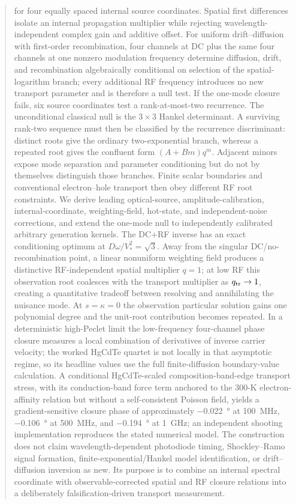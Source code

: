 \documentclass[11pt]{article}
\begin{document}
\begin{abstract}
for four equally spaced internal source coordinates. Spatial first differences isolate an internal propagation multiplier while rejecting wavelength-independent complex gain and additive offset. For uniform drift--diffusion with first-order recombination, four channels at DC plus the same four channels at one nonzero modulation frequency determine diffusion, drift, and recombination algebraically conditional on selection of the spatial-logarithm branch; every additional RF frequency introduces no new transport parameter and is therefore a null test. If the one-mode closure fails, six source coordinates test a rank-at-most-two recurrence. The unconditional classical null is the $3\times3$ Hankel determinant. A surviving rank-two sequence must then be classified by the recurrence discriminant: distinct roots give the ordinary two-exponential branch, whereas a repeated root gives the confluent form $(A+Bm)q^m$. Adjacent minors expose mode separation and parameter conditioning but do not by themselves distinguish those branches. Finite scalar boundaries and conventional electron--hole transport then obey different RF root constraints. We derive leading optical-source, amplitude-calibration, internal-coordinate, weighting-field, hot-state, and independent-noise corrections, and extend the one-mode null to independently calibrated arbitrary generation kernels. The DC+RF inverse has an exact conditioning optimum at $D\omega/V_*^2=\sqrt{3}$. Away from the singular DC/no-recombination point, a linear nonuniform weighting field produces a distinctive RF-independent spatial multiplier $q=1$; at low RF this observation root coalesces with the transport multiplier as $q_{\rm tr}\to1$, creating a quantitative tradeoff between resolving and annihilating the nuisance mode. At $s=\kappa=0$ the observation particular solution gains one polynomial degree and the unit-root contribution becomes repeated. In a deterministic high-Peclet limit the low-frequency four-channel phase closure measures a local combination of derivatives of inverse carrier velocity; the worked HgCdTe quartet is not locally in that asymptotic regime, so its headline values use the full finite-diffusion boundary-value calculation. A conditional HgCdTe-scaled composition-band-edge transport stress, with its conduction-band force term anchored to the 300-K electron-affinity relation but without a self-consistent Poisson field, yields a gradient-sensitive closure phase of approximately \SI{-0.022}{\degree} at \SI{100}{MHz}, \SI{-0.106}{\degree} at \SI{500}{MHz}, and \SI{-0.194}{\degree} at \SI{1}{GHz}; an independent shooting implementation reproduces the stated numerical model. The construction does not claim wavelength-dependent photodiode timing, Shockley--Ramo signal formation, finite-exponential/Hankel model identification, or drift--diffusion inversion as new. Its purpose is to combine an internal spectral coordinate with observable-corrected spatial and RF closure relations into a deliberately falsification-driven transport measurement.
\end{abstract}
\end{document}
